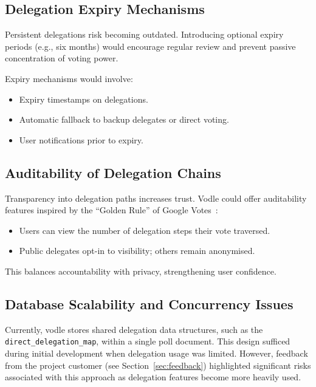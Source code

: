 \subsection{Delegation Expiry Mechanisms}

Persistent delegations risk becoming outdated. Introducing optional expiry periods (e.g., six months) would encourage regular review and prevent passive concentration of voting power.

Expiry mechanisms would involve:

\begin{itemize}
    \item Expiry timestamps on delegations.
    \item Automatic fallback to backup delegates or direct voting.
    \item User notifications prior to expiry.
\end{itemize}

\subsection{Auditability of Delegation Chains}

Transparency into delegation paths increases trust. Vodle could offer auditability features inspired by the ``Golden Rule'' of Google Votes~\citep{hardt_google_2015}:

\begin{itemize}
    \item Users can view the number of delegation steps their vote traversed.
    \item Public delegates opt-in to visibility; others remain anonymised.
\end{itemize}

This balances accountability with privacy, strengthening user confidence.

\subsection{Database Scalability and Concurrency Issues}

Currently, vodle stores shared delegation data structures, such as the \\\texttt{direct\_delegation\_map}, within a single poll document. This design sufficed during initial development when delegation usage was limited. However, feedback from the project customer (see Section~\ref{sec:feedback}) highlighted significant risks associated with this approach as delegation features become more heavily used.

